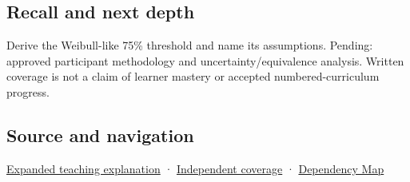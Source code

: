 \subsection{Recall and next depth}\label{appendix-1759f03e8ce7-recall-and-next-depth}

Derive the Weibull-like 75\% threshold and name its assumptions. Pending: approved participant methodology and uncertainty/equivalence analysis. Written coverage is not a claim of learner mastery or accepted numbered-curriculum progress.

\subsection{Source and navigation}\label{appendix-1759f03e8ce7-source-and-navigation}

\hyperref[04-visual-computing-ii-ch042-a-threshold-is-evidence-from-a-procedure-not-a-universal-border]{Expanded teaching explanation} · \hyperref[appendix-fd090d982a15-xr01---independent-seeing-and-representation-source]{Independent coverage} · \hyperref[appendix-4ad47bdd269a]{Dependency Map}
